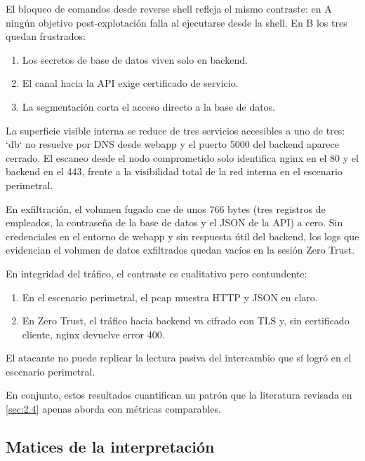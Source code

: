 \documentclass[11pt,spanish,listoffigures,listoftables]{tfgetsinf}
\begin{document}
        El bloqueo de comandos desde reverse shell refleja el mismo contraste: en A ningún objetivo post-explotación falla al ejecutarse desde la shell. En B los tres quedan frustrados:
        \begin{enumerate}
            \item Los secretos de base de datos viven solo en backend.
            \item El canal hacia la API exige certificado de servicio.
            \item La segmentación corta el acceso directo a la base de datos.
        \end{enumerate}
        
        La superficie visible interna se reduce de tres servicios accesibles a uno de tres: `db` no resuelve por DNS desde webapp y el puerto 5000 del backend aparece cerrado. El escaneo desde el nodo comprometido solo identifica nginx en el 80 y el backend en el 443, frente a la visibilidad total de la red interna en el escenario perimetral.
        
        En exfiltración, el volumen fugado cae de unos 766 bytes (tres registros de empleados, la contraseña de la base de datos y el JSON de la API) a cero. Sin credenciales en el entorno de webapp y sin respuesta útil del backend, los logs que evidencian el volumen de datos exfiltrados quedan vacíos en la sesión Zero Trust.
        
        En integridad del tráfico, el contraste es cualitativo pero contundente:
        \begin{enumerate}
            \item En el escenario perimetral, el pcap muestra HTTP y JSON en claro.
            \item En Zero Trust, el tráfico hacia backend va cifrado con TLS y, sin certificado cliente, nginx devuelve error 400.
        \end{enumerate}
        
        El atacante no puede replicar la lectura pasiva del intercambio que sí logró en el escenario perimetral.
        
        En conjunto, estos resultados cuantifican un patrón que la literatura revisada en \cref{sec:2.4} apenas aborda con métricas comparables.

        \subsection{Matices de la interpretación}
        \label{sec:6.4.3}
\end{document}
